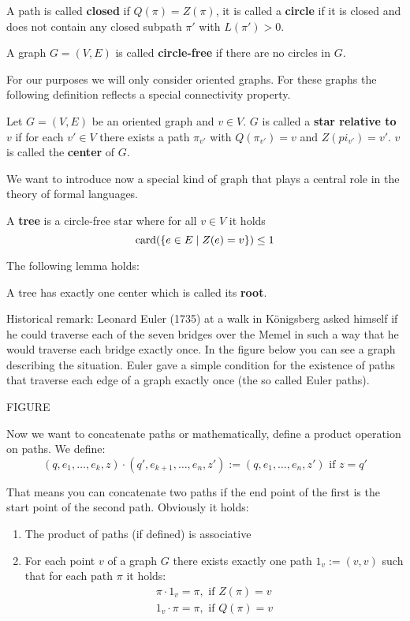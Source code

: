A path is called {\bf closed} if $Q(\pi) = Z(\pi)$, it is called a {\bf circle}
if it is closed and does not contain any closed subpath $\pi'$ with $L(\pi') >
0$.

\begin{definition}
A graph $G = (V, E)$ is called {\bf circle-free} if there are no circles in $G$.
\end{definition}

For our purposes we will only consider oriented graphs. For these graphs the
following definition reflects a special connectivity property.

\begin{definition}
Let $G = (V, E)$ be an oriented graph and $v \in V$. $G$ is called a {\bf star
relative to $v$} if for each $v' \in V$ there exists a path $\pi_{v'}$ with
$Q(\pi_{v'}) = v$ and $Z(pi_{v'}) = v'$. $v$ is called the {\bf center} of $G$.
\end{definition} 

We want to introduce now a special kind of graph that plays a central role in
the theory of formal languages.

\begin{definition}
A {\bf tree} is a circle-free star where for all $v \in V$ it holds
\[ \mathrm{card}(\mbox{$\{e \in E \mid Z(e) = v\}$}) \leq 1 \]
\end{definition}

The following lemma holds:
\begin{lemma}
A tree has exactly one center which is called its {\bf root}.
\end{lemma}

Historical remark: Leonard Euler (1735) at a walk in Königsberg asked himself if
he could traverse each of the seven bridges over the Memel in such
a way that he would traverse each bridge exactly once. In the figure below you
can see a graph describing the situation. Euler gave a simple condition for the
existence of paths that traverse each edge of a graph exactly once (the so
called Euler paths).

FIGURE

Now we want to concatenate paths or mathematically, define a product operation
on paths. We define:
\[ (q, e_1, \ldots, e_k, z) \cdot (q', e_{k+1}, \ldots, e_n, z') := (q, e_1,
\ldots, e_n, z')\text{ if } z = q' \]

That means you can concatenate two paths if the end point of the first is the
start point of the second path. Obviously it holds:
\begin{enumerate}
  \item The product of paths (if defined) is associative
  \item For each point $v$ of a graph $G$ there exists exactly one path $1_v :=
  (v, v)$ such that for each path $\pi$ it holds:
  	\begin{eqnarray*}
    	\pi \cdot 1_v = \pi,\text{ if }Z(\pi) = v \\
    	1_v \cdot \pi = \pi,\text{ if }Q(\pi) = v
  	\end{eqnarray*}
\end{enumerate}

